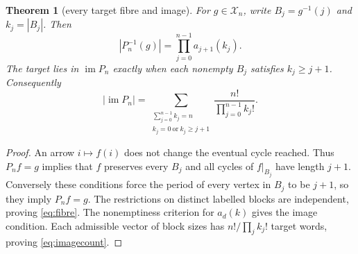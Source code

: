 \documentclass[a4paper,10pt]{amsart}
\newtheorem{theorem}{Theorem}[section]
\theoremstyle{remark}
\newcommand{\im}{\operatorname{im}}
\newcommand{\calX}{\mathcal X}
\begin{document}
\begin{theorem}[every target fibre and image]\label{thm:inverse}
For $g\in\calX_n$, write $B_j=g^{-1}(j)$ and $k_j=|B_j|$. Then
\begin{equation}\label{eq:fibre}
 |P_n^{-1}(g)|=\prod_{j=0}^{n-1}a_{j+1}(k_j).
\end{equation}
The target lies in $\im P_n$ exactly when each nonempty $B_j$ satisfies
$k_j\ge j+1$. Consequently
\begin{equation}\label{eq:imagecount}
 |\im P_n|=\sum_{\substack{\sum_{j=0}^{n-1}k_j=n\\
                   k_j=0\ \mathrm{or}\ k_j\ge j+1}}
                \frac{n!}{\prod_{j=0}^{n-1}k_j!}.
\end{equation}
\end{theorem}
\begin{proof}
An arrow $i\mapsto f(i)$ does not change the eventual cycle reached.
Thus $P_nf=g$ implies that $f$ preserves every $B_j$ and all cycles of
$f|_{B_j}$ have length $j+1$. Conversely these conditions force the
period of every vertex in $B_j$ to be $j+1$, so they imply $P_nf=g$.
The restrictions on distinct labelled blocks are independent, proving
\eqref{eq:fibre}. The nonemptiness criterion for $a_d(k)$ gives the
image condition. Each admissible vector of block sizes has
$n!/\prod_j k_j!$ target words, proving \eqref{eq:imagecount}.
\end{proof}
\end{document}
